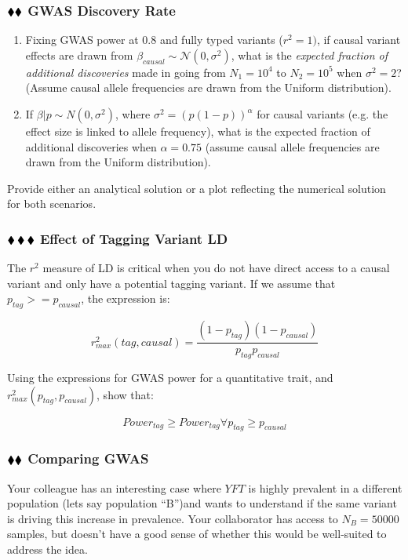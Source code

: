 \documentclass{pset}
\begin{document}
\subsubsection*{$\mathbin{\blacklozenge}\mathbin{\blacklozenge}$ GWAS Discovery Rate} 

\begin{enumerate}
\item Fixing GWAS power at $0.8$ and fully typed variants ($r^2 = 1)$, if causal variant effects are drawn from $\beta_{causal} \sim \mathcal{N}(0,\sigma^2)$, what is the \textit{expected fraction of additional discoveries} made in going from $N_1 = 10^4$ to $N_2 = 10^5$ when $\sigma^2 = 2$? (Assume causal allele frequencies are drawn from the Uniform distribution). 
	
\item If $\beta | p \sim N(0, \sigma^2)$, where $\sigma^2 = \left(p(1-p)\right)^{\alpha}$ for causal variants (e.g. the effect size is linked to allele frequency), what is the expected fraction of additional discoveries when $\alpha = 0.75$ (assume causal allele frequencies are drawn from the Uniform distribution).
\end{enumerate}

Provide either an analytical solution or a plot reflecting the numerical solution for both scenarios. 

\subsubsection*{$\mathbin{\blacklozenge}\mathbin{\blacklozenge}\mathbin{\blacklozenge}$  Effect of Tagging Variant LD}

The $r^2$ measure of LD is critical when you do not have direct access to a causal variant and only have a potential tagging variant. If we assume that $p_{tag} >= p_{causal}$, the expression is: 

$$r^2_{max}(tag, causal) = \frac{(1 - p_{tag})(1 - p_{causal})}{p_{tag}p_{causal}}$$

Using the expressions for GWAS power for a quantitative trait, and $r^2_{max}(p_{tag}, p_{causal})$, show that:

$$Power_{tag} \geq Power_{tag} \forall p_{tag} \geq p_{causal}$$

\subsubsection*{$\mathbin{\blacklozenge}\mathbin{\blacklozenge}$ Comparing GWAS}

Your colleague has an interesting case where $YFT$ is highly prevalent in a different population (lets say population ``B'')and wants to understand if the same variant is driving this increase in prevalence. Your collaborator has access to $N_B=50000$ samples, but doesn't have a good sense of whether this would be well-suited to address the idea.
\end{document}
